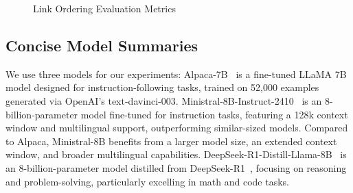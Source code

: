 \documentclass[12pt,a4paper]{article}
\newcommand{\modelministral}{Ministral-8B\xspace}
\newcommand{\modeldeepseek}{R1-Distill-8B\xspace}
\begin{document}
\begin{figure}[ht]
    \centering
    \caption{Link Ordering Evaluation Metrics}
    \label{fig:link_ordering}
\end{figure}



\subsection{Concise Model Summaries}

We use three models for our experiments:
Alpaca-7B~\cite{taori2023stanford} is a fine-tuned LLaMA 7B model designed for instruction-following tasks, trained on 52,000 examples generated via OpenAI’s text-davinci-003.
Ministral-8B-Instruct-2410~\cite{mistralai2024ministral8b} is an 8-billion-parameter model fine-tuned for instruction tasks, featuring a 128k context window and multilingual support, outperforming similar-sized models.
Compared to Alpaca, Ministral-8B benefits from a larger model size, an extended context window, and broader multilingual capabilities.
DeepSeek-R1-Distill-Llama-8B~\cite{deepseekai2025deepseekr1distillllama8b} is an 8-billion-parameter model distilled from DeepSeek-R1~\cite{guo2025deepseek}, focusing on reasoning and problem-solving, particularly excelling in math and code tasks.
\end{document}
